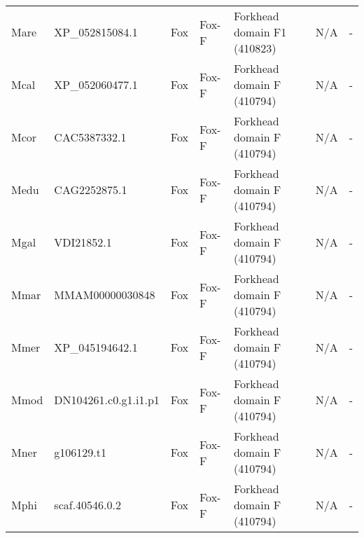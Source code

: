 \documentclass[../main.tex]{subfiles}
\begin{document}
\begin{landscape}
\begin{longtable}{lllllll}
		Mare           & XP\_052815084.1       & Fox            & Fox-F               & Forkhead domain F1 (410823)                 & N/A                                                                    & -                    \\
		Mcal           & XP\_052060477.1       & Fox            & Fox-F               & Forkhead domain F (410794)                  & N/A                                                                    & -                    \\
		Mcor           & CAC5387332.1          & Fox            & Fox-F               & Forkhead domain F (410794)                  & N/A                                                                    & -                    \\
		Medu           & CAG2252875.1          & Fox            & Fox-F               & Forkhead domain F (410794)                  & N/A                                                                    & -                    \\
		Mgal           & VDI21852.1            & Fox            & Fox-F               & Forkhead domain F (410794)                  & N/A                                                                    & -                    \\
		Mmar           & MMAM00000030848       & Fox            & Fox-F               & Forkhead domain F (410794)                  & N/A                                                                    & -                    \\
		Mmer           & XP\_045194642.1       & Fox            & Fox-F               & Forkhead domain F (410794)                  & N/A                                                                    & -                    \\
		Mmod           & DN104261.c0.g1.i1.p1  & Fox            & Fox-F               & Forkhead domain F (410794)                  & N/A                                                                    & -                    \\
		Mner           & g106129.t1            & Fox            & Fox-F               & Forkhead domain F (410794)                  & N/A                                                                    & -                    \\
		Mphi           & scaf.40546.0.2        & Fox            & Fox-F               & Forkhead domain F (410794)                  & N/A                                                                    & -                    \\

\end{longtable}
\end{landscape}
\end{document}
